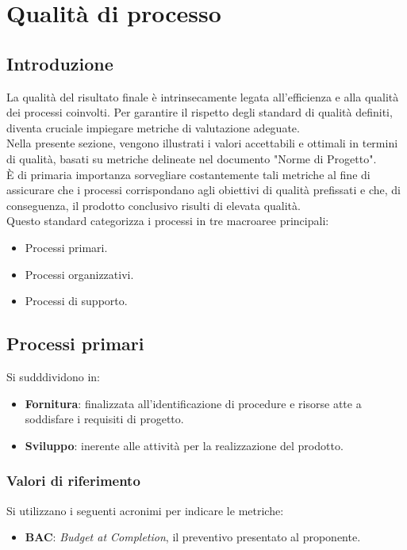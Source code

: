 \section{Qualità di processo}
\subsection{Introduzione}
La qualità del risultato finale è intrinsecamente legata all'efficienza e alla qualità dei processi coinvolti. 
Per garantire il rispetto degli standard di qualità definiti, diventa cruciale impiegare metriche di valutazione adeguate.\\
Nella presente sezione, vengono illustrati i valori accettabili e ottimali in termini di qualità, basati su metriche delineate nel documento "Norme di Progetto". \\
È di primaria importanza sorvegliare costantemente tali metriche al fine di assicurare che i processi corrispondano agli obiettivi di qualità prefissati e che, di conseguenza, il prodotto conclusivo risulti di elevata qualità.\\

\noindent
Questo standard categorizza i processi in tre macroaree principali:
\begin{itemize}
    \item Processi primari.
    \item Processi organizzativi.
    \item Processi di supporto.
\end{itemize}


\subsection{Processi primari}
Si sudddividono in:
\begin{itemize}
    \item \textbf{Fornitura}: finalizzata all'identificazione di procedure e risorse atte a soddisfare i requisiti di progetto.
    \item \textbf{Sviluppo}: inerente alle attività per la realizzazione del prodotto.
\end{itemize}

\subsubsection{Valori di riferimento}
Si utilizzano i seguenti acronimi per indicare le metriche:
\begin{itemize}
    \item \textbf{BAC}: \textit{Budget at Completion}, il preventivo presentato al proponente.
\end{itemize}

